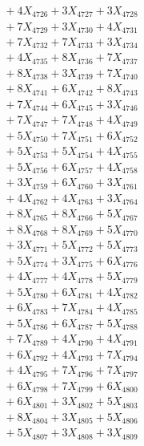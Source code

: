 \documentclass[a4paper,10pt]{article}
\begin{document}
{\begin{align}
&\;  + 4 X_{4726} + 3 X_{4727} + 3 X_{4728} \\[0.3ex]
&\;  + 7 X_{4729} + 3 X_{4730} + 4 X_{4731} \\[0.3ex]
&\;  + 7 X_{4732} + 7 X_{4733} + 3 X_{4734} \\[0.3ex]
&\;  + 4 X_{4735} + 8 X_{4736} + 7 X_{4737} \\[0.3ex]
&\;  + 8 X_{4738} + 3 X_{4739} + 7 X_{4740} \\[0.3ex]
&\;  + 8 X_{4741} + 6 X_{4742} + 8 X_{4743} \\[0.3ex]
&\;  + 7 X_{4744} + 6 X_{4745} + 3 X_{4746} \\[0.3ex]
&\;  + 7 X_{4747} + 7 X_{4748} + 4 X_{4749} \\[0.5ex]\allowbreak
&\;  + 5 X_{4750} + 7 X_{4751} + 6 X_{4752} \\[0.3ex]
&\;  + 5 X_{4753} + 5 X_{4754} + 4 X_{4755} \\[0.3ex]
&\;  + 5 X_{4756} + 6 X_{4757} + 4 X_{4758} \\[0.3ex]
&\;  + 3 X_{4759} + 6 X_{4760} + 3 X_{4761} \\[0.3ex]
&\;  + 4 X_{4762} + 4 X_{4763} + 3 X_{4764} \\[0.3ex]
&\;  + 8 X_{4765} + 8 X_{4766} + 5 X_{4767} \\[0.3ex]
&\;  + 8 X_{4768} + 8 X_{4769} + 5 X_{4770} \\[0.3ex]
&\;  + 3 X_{4771} + 5 X_{4772} + 5 X_{4773} \\[0.3ex]
&\;  + 5 X_{4774} + 3 X_{4775} + 6 X_{4776} \\[0.3ex]
&\;  + 4 X_{4777} + 4 X_{4778} + 5 X_{4779} \\[0.5ex]\allowbreak
&\;  + 5 X_{4780} + 6 X_{4781} + 4 X_{4782} \\[0.3ex]
&\;  + 6 X_{4783} + 7 X_{4784} + 4 X_{4785} \\[0.3ex]
&\;  + 5 X_{4786} + 6 X_{4787} + 5 X_{4788} \\[0.3ex]
&\;  + 7 X_{4789} + 4 X_{4790} + 4 X_{4791} \\[0.3ex]
&\;  + 6 X_{4792} + 4 X_{4793} + 7 X_{4794} \\[0.3ex]
&\;  + 4 X_{4795} + 7 X_{4796} + 7 X_{4797} \\[0.3ex]
&\;  + 6 X_{4798} + 7 X_{4799} + 6 X_{4800} \\[0.3ex]
&\;  + 6 X_{4801} + 3 X_{4802} + 5 X_{4803} \\[0.3ex]
&\;  + 8 X_{4804} + 3 X_{4805} + 5 X_{4806} \\[0.3ex]
&\;  + 5 X_{4807} + 3 X_{4808} + 3 X_{4809} \\[0.5ex]\allowbreak

\end{align}}
\end{document}
